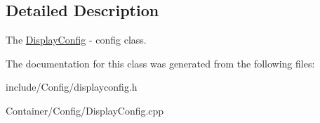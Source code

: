 \subsection{Detailed Description}
The \hyperlink{classEngine_1_1DisplayConfig}{Display\+Config} -\/ config class. 

The documentation for this class was generated from the following files\+:\begin{DoxyCompactItemize}
\item 
include/\+Config/displayconfig.\+h\item 
Container/\+Config/Display\+Config.\+cpp\end{DoxyCompactItemize}
